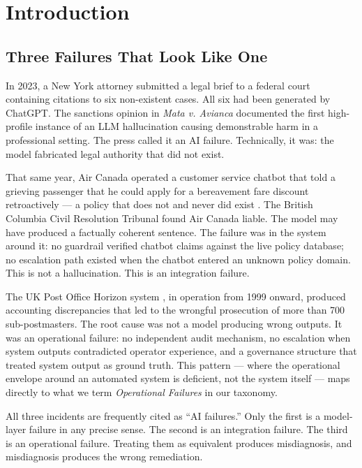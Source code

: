 \documentclass{article}
\begin{document}
\section{Introduction}
\label{sec:intro}

\subsection{Three Failures That Look Like One}

In 2023, a New York attorney submitted a legal brief to a federal court
containing citations to six non-existent cases.  All six had been generated by
ChatGPT.  The sanctions opinion in \emph{Mata v. Avianca} \citep{mata2023avianca}
documented the first high-profile instance of an LLM hallucination causing
demonstrable harm in a professional setting.  The press called it an AI failure.
Technically, it was: the model fabricated legal authority that did not exist.

That same year, Air Canada operated a customer service chatbot that told a
grieving passenger that he could apply for a bereavement fare discount
retroactively --- a policy that does not and never did exist
\citep{aircanada2024chatbot}.  The British Columbia Civil Resolution Tribunal
found Air Canada liable.  The model may have produced a factually coherent
sentence.  The failure was in the system around it: no guardrail verified
chatbot claims against the live policy database; no escalation path existed when
the chatbot entered an unknown policy domain.  This is not a hallucination.
This is an integration failure.

The UK Post Office Horizon system \citep{ukposthorizon2024}, in operation from
1999 onward, produced accounting discrepancies that led to the wrongful
prosecution of more than 700 sub-postmasters.  The root cause was not a model
producing wrong outputs.  It was an operational failure: no independent audit
mechanism, no escalation when system outputs contradicted operator experience,
and a governance structure that treated system output as ground truth.  This
pattern --- where the operational envelope around an automated system is
deficient, not the system itself --- maps directly to what we term
\emph{Operational Failures} in our taxonomy.

All three incidents are frequently cited as ``AI failures.''  Only the first
is a model-layer failure in any precise sense.  The second is an integration
failure.  The third is an operational failure.  Treating them as equivalent
produces misdiagnosis, and misdiagnosis produces the wrong remediation.
\end{document}
